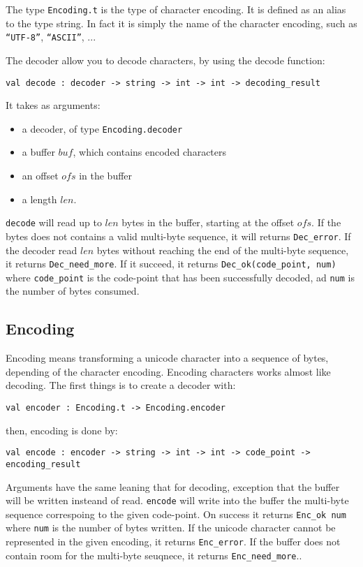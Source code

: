 \documentclass{article}
\begin{document}
The type \texttt{Encoding.t} is the type of character encoding. It is
defined as an alias to the type string. In fact it is simply the name
of the character encoding, such as \texttt{``UTF-8''},
\texttt{``ASCII''}, ...

The decoder allow you to decode characters, by using the decode
function:

\begin{verbatim}
val decode : decoder -> string -> int -> int -> decoding_result
\end{verbatim}

It takes as arguments:
\begin{itemize}
\item a decoder, of type \texttt{Encoding.decoder}
\item a buffer $buf$, which contains encoded characters
\item an offset $ofs$ in the buffer
\item a length $len$.
\end{itemize}

\texttt{decode} will read up to $len$ bytes in the buffer, starting at
the offset $ofs$. If the bytes does not contains a valid multi-byte
sequence, it will returns \texttt{Dec\_error}. If the decoder read
$len$ bytes without reaching the end of the multi-byte sequence, it
returns \texttt{Dec\_need\_more}. If it succeed, it returns
\texttt{Dec\_ok(code\_point, num)} where \texttt{code\_point} is the
code-point that has been successfully decoded, ad \texttt{num} is the
number of bytes consumed.

\subsection{Encoding}

Encoding means transforming a unicode character into a sequence of
bytes, depending of the character encoding. Encoding characters works
almost like decoding. The first things is to create a decoder with:

\begin{verbatim}
val encoder : Encoding.t -> Encoding.encoder
\end{verbatim}

then, encoding is done by:

\begin{verbatim}
val encode : encoder -> string -> int -> int -> code_point -> encoding_result
\end{verbatim}

Arguments have the same leaning that for decoding, exception that the
buffer will be written insteand of read. \texttt{encode} will write
into the buffer the multi-byte sequence correspoing to the given
code-point. On success it returns \texttt{Enc\_ok num} where
\texttt{num} is the number of bytes written. If the unicode character
cannot be represented in the given encoding, it returns
\texttt{Enc\_error}. If the buffer does not contain room for the
multi-byte seuqnece, it returns \texttt{Enc\_need\_more}..
\end{document}
